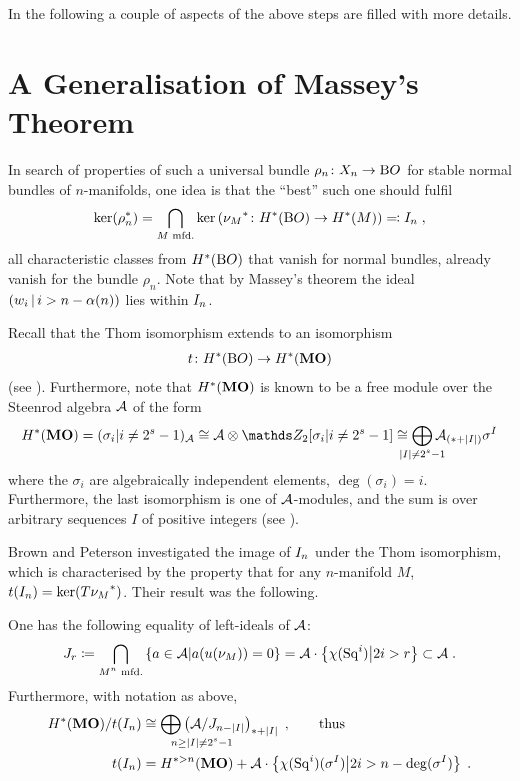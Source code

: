 In the following a couple of aspects of the above steps are filled
with more details.


\section*{A Generalisation of Massey's Theorem}
In search of properties of such a universal bundle
$\rho_n\colon X_n\to\mathrm{B}O$ for stable normal bundles of $n$-manifolds,
one idea is that the \enquote{best} such one should fulfil
\begin{gather*}
  \ker({\rho}^*_n)
  = \bigcap_{\text{$M$ mfd.}}
  \ker\left({\nu_{M}}^*\colon H^*(\mathrm{B}O)\to H^*(M)\right)
  \eqqcolon I_{n}
  \;,
\end{gather*}
\idest all characteristic classes from $H^*(\mathrm{B}O)$ that vanish for
normal bundles, already vanish for the bundle $\rho_n$.
Note that by Massey's theorem the ideal
$\left(w_{i}\,\middle|\,i>n-\alpha(n)\right)$ lies within $I_{n}$.

\begin{Rem*}
Recall that the Thom isomorphism extends to an isomorphism
\begin{gather*}
  t\colon H^*(\mathrm{B}O) \to H^*(\bm{\mathrm{MO}})
\end{gather*}
(see \forexample \cite{milnor}).
Furthermore, note that $H^*(\bm{\mathrm{MO}})$ is known to be a free module
over the Steenrod algebra $\mathcal{A}$ of the form
\begin{gather*}
  \H^*(\MOspec)
  = (\sigma_i| i\neq 2^s-1)_{\A}
  \cong \A\otimes \Zmod2[\sigma_i|i\neq 2^s-1]
  \cong \bigoplus_{\mathclap{\Deg{I}\neq 2^s-1}}
  \A_{(*+\Deg{I})}\sigma^I
\end{gather*}
where the $\sigma_i$ are algebraically independent elements,
$\deg(\sigma_i)=i$.
Furthermore, the last isomorphism is one of $\mathcal{A}$-modules, and the sum
is over arbitrary sequences $I$ of positive integers
(see \cite[p.~82]{immersionconj}). %
\end{Rem*}

Brown and Peterson investigated the image of $I_{n}$ under the Thom
isomorphism, which is characterised by the property that for any
$n$-manifold $M$, $t(I_{n})=\ker({T{\nu_{M}}}^*)$.
Their result was the following.
\begin{Thm*}
  One has the following equality of left-ideals of $\mathcal{A}$:
  \begin{gather*}
    J_{r}
    \coloneqq \bigcap_{\text{$M^n$ mfd.}}
    \left\{ a\in\mathcal{A} \middle| a({u}(\nu_{M})) = 0 \right\}
    = \mathcal{A} \cdot \left\{\chi(\mathrm{Sq}^{i}) \middle| 2i>r\right\}
    \subset \mathcal{A}
    \;.
  \end{gather*}
  Furthermore, with notation as above,
  \begin{align*}
    \H^*(\MOspec)/\thomiso(\I n)
    &\cong \bigoplus_{\mathrlap{n\geq\Deg{I}\neq 2^s-1}}
      \left( \A / \J{n-\Deg{I}} \right)_{*+\Deg{I}}
      \;,\qquad\text{thus}\\
    \thomiso(\I n)
    &= \H^{*>n}(\MOspec)
    + \A\cdot \left\{
      \antipode(\Sq i)(\sigma^I) \middle| 2i>n-\deg(\sigma^I)
    \right\}
      \;.
  \end{align*}
\end{Thm*}

